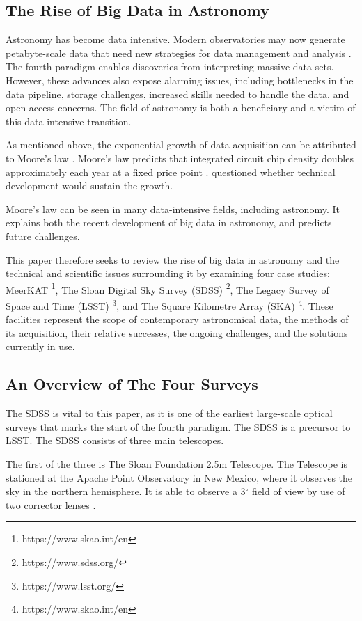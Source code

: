 \documentclass[preprint,linenumbers, longauthor]{aastex631}
\begin{document}
\subsection{The Rise of Big Data in Astronomy}
Astronomy has become data intensive. Modern observatories may now generate petabyte-scale data that need new strategies for data management and analysis \cite{heyFourthParadigmDataIntensive2009}. 
The fourth paradigm enables discoveries from interpreting massive data sets. 
However, these advances also expose alarming issues, including bottlenecks in the data pipeline, storage challenges, increased skills needed to handle the data, and open access concerns. 
The field of astronomy is both a beneficiary and a victim of this data-intensive transition. 

As mentioned above, the exponential growth of data acquisition can be attributed to Moore's law \cite{heyFourthParadigmDataIntensive2009}.  
Moore's law predicts that integrated circuit chip density doubles approximately each year at a fixed price point \cite{mooreCrammingMoreComponents2006}.
\cite{mooreCrammingMoreComponents2006} questioned whether technical development would sustain the growth.

Moore's law can be seen in many data-intensive fields, including astronomy.
It explains both the recent development of big data in astronomy, and predicts future challenges.

This paper therefore seeks to review the rise of big data in astronomy and the technical and scientific issues surrounding it by examining four case studies: MeerKAT \footnote{https://www.skao.int/en}, The Sloan Digital Sky Survey (SDSS) \footnote{https://www.sdss.org/}, The Legacy Survey of Space and Time (LSST) \footnote{https://www.lsst.org/}, and The Square Kilometre Array (SKA) \footnote{https://www.skao.int/en}. 
These facilities represent the scope of contemporary astronomical data, the methods of its acquisition, their relative successes, the ongoing challenges, and the solutions currently in use.

\subsection{An Overview of The Four Surveys}
The SDSS is vital to this paper, as it is one of the earliest large-scale optical surveys that marks the start of the fourth paradigm. 
The SDSS is a precursor to LSST. The SDSS
consists of three main telescopes.

The first of the three is The Sloan Foundation 2.5m Telescope. 
The Telescope is stationed at the Apache Point Observatory in New Mexico, where it observes the sky in the northern hemisphere. 
It is able to observe a 3$^\circ$ field of view by use of two corrector lenses \citep{gunn25TelescopeSloan2006}.
\end{document}
